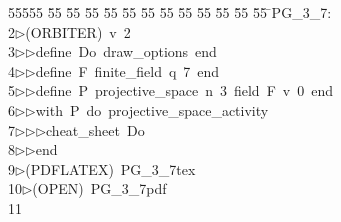 %
%
\begin{tabbing}
55555 \= 55 \= 55 \= 55 \= 55 \= 55 \= 55 \= 55 \= 55 \= 55 \= 55 \= 55 \= 55 \= \>PG\_3\_7:\\[0pt]
2\>$\triangleright$\>(ORBITER)\ v\ 2\ \\[0pt]
3\>$\triangleright$\>$\triangleright$\>define\ Do\ draw\_options\ end\ \\[0pt]
4\>$\triangleright$\>$\triangleright$\>define\ F\ finite\_field\ q\ 7\ end\ \\[0pt]
5\>$\triangleright$\>$\triangleright$\>define\ P\ projective\_space\ n\ 3\ field\ F\ v\ 0\ end\ \\[0pt]
6\>$\triangleright$\>$\triangleright$\>with\ P\ do\ projective\_space\_activity\ \\[0pt]
7\>$\triangleright$\>$\triangleright$\>$\triangleright$\>cheat\_sheet\ Do\ \\[0pt]
8\>$\triangleright$\>$\triangleright$\>end\\[0pt]
9\>$\triangleright$\>(PDFLATEX)\ PG\_3\_7tex\ \\[0pt]
10\>$\triangleright$\>(OPEN)\ PG\_3\_7pdf\\[0pt]
11\>\end{tabbing}
